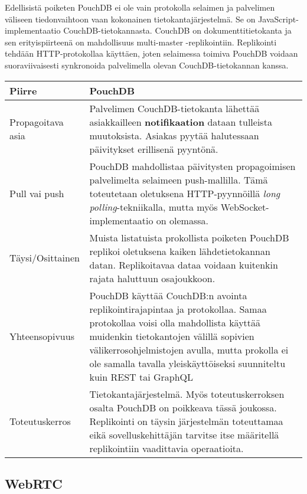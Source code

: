 \documentclass[finnish,twoside,censored,csm,sw-track-2018]{HYthesisML}
\begin{document}
Edellisistä poiketen PouchDB \citep{pouchdb} ei ole vain protokolla selaimen ja palvelimen väliseen tiedonvaihtoon vaan kokonainen tietokantajärjestelmä. Se on JavaScript-implementaatio CouchDB-tietokannasta. CouchDB on dokumenttitietokanta ja sen erityispiirteenä on mahdollisuus multi-master -replikointiin. Replikointi tehdään HTTP-protokollaa käyttäen, joten selaimessa toimiva PouchDB voidaan suoraviivaisesti synkronoida palvelimella olevan CouchDB-tietokannan kanssa.

\begin{center}
\begin{tabular}{ | m{3.3cm} | m{11.7cm} | }
 \hline
 \textbf{Piirre} & \textbf{PouchDB}\\ 
 \hline
 Propagoitava asia & Palvelimen CouchDB-tietokanta lähettää asiakkailleen \textbf{notifikaation} dataan tulleista muutoksista. Asiakas pyytää halutessaan päivitykset erillisenä pyyntönä.\\
 \hline
 Pull vai push & PouchDB mahdollistaa päivitysten propagoimisen palvelimelta selaimeen push-mallilla. Tämä toteutetaan oletuksena HTTP-pyynnöillä \textit{long polling}-tekniikalla, mutta myös WebSocket-implementaatio on olemassa. \citep{pouchdb_polling}\\
 \hline
 Täysi/Osittainen & Muista listatuista prokollista poiketen PouchDB replikoi oletuksena kaiken lähdetietokannan datan. Replikoitavaa dataa voidaan kuitenkin rajata haluttuun osajoukkoon. \\
 \hline
 Yhteensopivuus & PouchDB käyttää CouchDB:n avointa replikointirajapintaa ja protokollaa. Samaa protokollaa voisi olla mahdollista käyttää muidenkin tietokantojen välillä sopivien välikerrosohjelmistojen avulla, mutta prokolla ei ole samalla tavalla yleiskäyttöiseksi suunniteltu kuin REST tai GraphQL\\
 \hline
 Toteutuskerros & Tietokantajärjestelmä. Myös toteutuskerroksen osalta PouchDB on poikkeava tässä joukossa. Replikointi on täysin järjestelmän toteuttamaa eikä sovelluskehittäjän tarvitse itse määritellä replikointiin vaadittavia operaatioita. \\
 \hline
\end{tabular}
\label{table-pouchdb}
\end{center}

\subsection{WebRTC}
\end{document}
